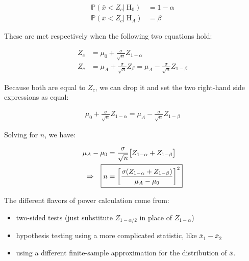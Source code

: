\documentclass{article}
\begin{document}
\begin{align*}
\mathbb{P}(\bar{x} < Z_c \big|\ \text{H}_0) &= 1 - \alpha\\
\mathbb{P}(\bar{x} < Z_c \big|\ \text{H}_A) &= \beta
\end{align*}

These are met respectively when the following two equations hold:

\begin{align*}
Z_c &= \mu_0 + \frac{\sigma}{\sqrt{n}}Z_{1 - \alpha} \\
Z_c &= \mu_A + \frac{\sigma}{\sqrt{n}}Z_{\beta} = \mu_A - \frac{\sigma}{\sqrt{n}}Z_{1 - \beta}
\end{align*}

Because both are equal to $Z_c$, we can drop it and set the two right-hand side expressions as equal:

\begin{align*}
\mu_0 + \frac{\sigma}{\sqrt{n}}Z_{1 - \alpha} = \mu_A - \frac{\sigma}{\sqrt{n}}Z_{1 - \beta}
\end{align*}

Solving for $n$, we have:

\begin{align*}
\mu_A - \mu_0 &= \frac{\sigma}{\sqrt{n}}\big[Z_{1 - \alpha} + Z_{1 - \beta}\big] \\
\Rightarrow\quad \Aboxed{n &= \left[\frac{\sigma(Z_{1 - \alpha} + Z_{1 - \beta})}{\mu_A - \mu_0}\right]^2} \\
\end{align*}

The different flavors of power calculation come from:

\begin{itemize}
\item two-sided tests (just substitute $Z_{1-\alpha/2}$ in place of $Z_{1-\alpha}$)
\item hypothesis testing using a more complicated statistic, like $\bar{x}_1-\bar{x}_2$
\item using a different finite-sample approximation for the distribution of $\bar{x}$.
\end{itemize}
\end{document}
